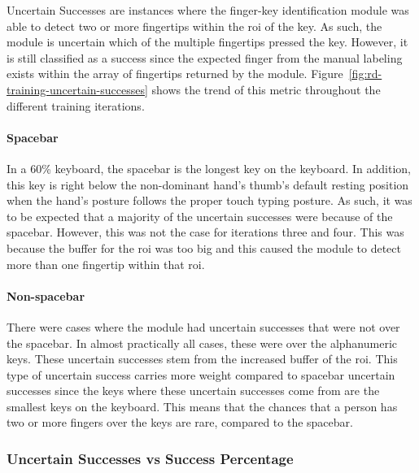 \documentclass[preprint,12pt,authoryear]{elsarticle}
\begin{document}
Uncertain Successes are instances where the finger-key identification module was
able to detect two or more fingertips within the \ac{roi} of the key. As such,
the module is uncertain which of the multiple fingertips pressed the key.
However, it is still classified as a success since the expected finger from the
manual labeling exists within the array of fingertips returned by the module.
Figure~\ref{fig:rd-training-uncertain-successes} shows the trend of this metric
throughout the different training iterations.

\paragraph{Spacebar}
In a 60\% keyboard, the spacebar is the longest key on the keyboard. In
addition, this key is right below the non-dominant hand's thumb's default
resting position when the hand's posture follows the proper touch typing
posture. As such, it was to be expected that a majority of the uncertain
successes were because of the spacebar. However, this was not the case for
iterations three and four. This was because the buffer for the \ac{roi} was too
big and this caused the module to detect more than one fingertip within that
\ac{roi}.

\paragraph{Non-spacebar}
There were cases where the module had uncertain successes that were not over the
spacebar. In almost practically all cases, these were over the alphanumeric
keys. These uncertain successes stem from the increased buffer of the \ac{roi}.
This type of uncertain success carries more weight compared to spacebar
uncertain successes since the keys where these uncertain successes come from are
the smallest keys on the keyboard. This means that the chances that a person has
two or more fingers over the keys are rare, compared to the spacebar.


\subsubsection{Uncertain Successes vs Success Percentage}
\label{section:rd-uncertain vs success}
\end{document}
